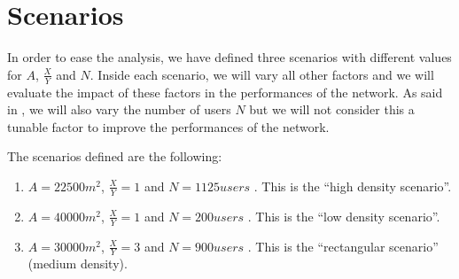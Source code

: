 \section{Scenarios}\label{sec:scenarios}

In order to ease the analysis, we have defined three scenarios with different
values for \(A\), \(\frac{X}{Y}\) and \(N\). Inside each scenario, we will vary
all other factors and we will evaluate the impact of these factors in the
performances of the network. As said in , we will also vary
the number of users \(N\) but we will not consider this a tunable factor to
improve the performances of the network.

The scenarios defined are the following:
\begin{enumerate}
	\item \(A = 22500m^2\), \(\frac{X}{Y} = 1\)  and \(N = 1125\mathit{users}\) . This is the ``high density
		scenario''.
	\item \(A = 40000m^2\), \(\frac{X}{Y} = 1\)  and \(N = 200\mathit{users}\) . This is the ``low density
		scenario''.
	\item \(A = 30000m^2\), \(\frac{X}{Y} = 3\)  and \(N = 900\mathit{users}\) . This is the
		``rectangular scenario'' (medium density).
\end{enumerate}


